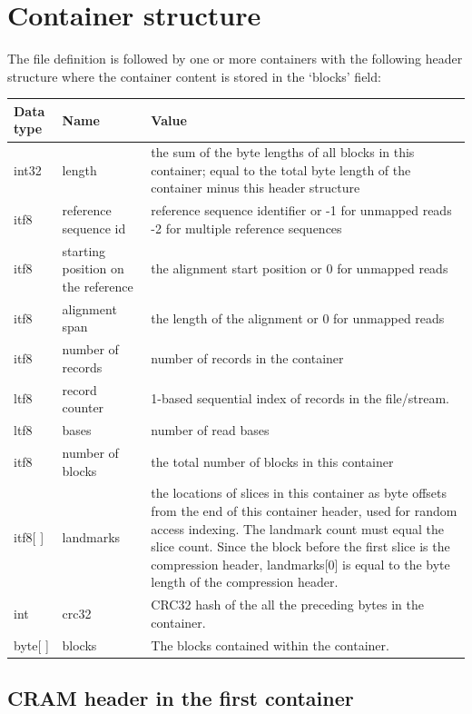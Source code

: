 \documentclass[a4paper]{article}
\begin{document}
\section{\textbf{Container structure}}

The file definition is followed by one or more containers with the following header 
structure where the container content is stored in the `blocks' field:

\begin{tabular}{|l|>{\raggedright}p{120pt}|>{\raggedright}p{260pt}|}
\hline
\textbf{Data type} & \textbf{Name} & \textbf{Value}
\tabularnewline
\hline
int32 & length & the sum of the byte lengths of all blocks in this container; 
equal to the total byte length of the container minus this header structure\tabularnewline
\hline
itf8 & reference sequence id & reference sequence identifier  or\linebreak{}
-1 for unmapped reads\linebreak{}
-2 for multiple reference sequences\tabularnewline
\hline
itf8 & starting position on the reference & the alignment start position or\linebreak{}
0 for unmapped reads\tabularnewline
\hline
itf8 & alignment span & the length of the alignment or\linebreak{}
0 for unmapped reads\tabularnewline
\hline
itf8 & number of records & number of records in the container\tabularnewline
\hline
ltf8 & record counter & 1-based sequential index of records in the file/stream.\tabularnewline
\hline
ltf8 & bases & number of read bases\tabularnewline
\hline
itf8 & number of blocks & the total number of blocks in this container\tabularnewline
\hline
itf8[ ] & landmarks & the locations of slices in this container as byte offsets from the end of 
this container header, used for random access indexing.
The landmark count must equal the slice count.\linebreak{}
Since the block before the first slice is the compression header,
landmarks[0] is equal to the byte length of the compression header.\tabularnewline
\hline
int & crc32 & CRC32 hash of the all the preceding bytes in the container.\tabularnewline
\hline
byte[ ] & blocks & The blocks contained within the container.\tabularnewline
\hline
\end{tabular}

\subsection{\textbf{CRAM header in the first container}}
\end{document}
